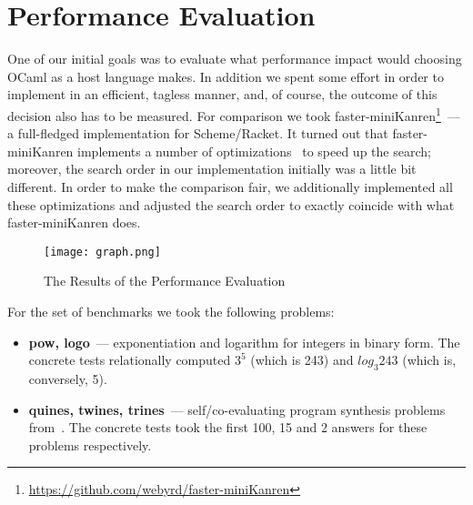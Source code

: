 
\section{Performance Evaluation}
\label{sec:evaluation}

One of our initial goals was to evaluate what performance impact would choosing OCaml as a host language makes. In addition we spent some
effort in order to implement \miniKanren in an efficient, tagless manner, and, of course, the outcome of this decision also has to be
measured. For comparison we took faster-miniKanren\footnote{\url{https://github.com/webyrd/faster-miniKanren}}~--- a full-fledged
\miniKanren implementation for Scheme/Racket. It turned out that faster-miniKanren implements a number of optimizations~\cite{WillThesis, Optimizations}
to speed up the search; moreover, the search order in our implementation initially was a little bit different. In order to make the comparison
fair, we additionally implemented all these optimizations and adjusted the search order to exactly coincide with
what faster-miniKanren does.

\begin{figure}[t]
\centering
\texttt{[image: graph.png]}
\caption{The Results of the Performance Evaluation}
\label{eval}
\end{figure}

\FloatBarrier

For the set of benchmarks we took the following problems:

\begin{itemize}
\item \textbf{pow, logo}~--- exponentiation and logarithm for integers in binary form. The concrete tests relationally computed
$3^5$ (which is 243) and $log_3 243$ (which is, conversely, 5).
\item \textbf{quines, twines, trines}~--- self/co-evaluating program synthesis problems from~\cite{Untagged}. The
concrete tests took the first 100, 15 and 2 answers for these problems respectively.
\end{itemize}

